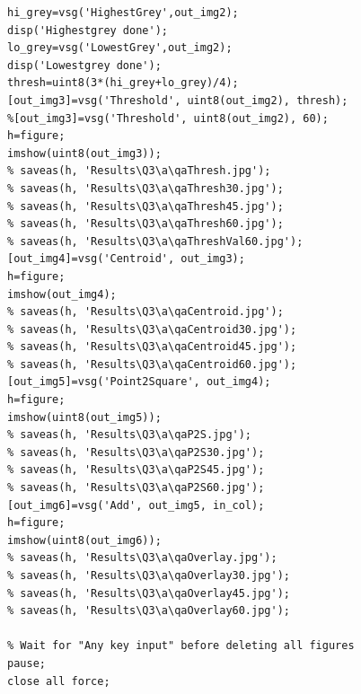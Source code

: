 \documentclass[a4paper]{article}
\begin{document}
\begin{lstlisting}[caption={Part 3 a}]
hi_grey=vsg('HighestGrey',out_img2);
disp('Highestgrey done');
lo_grey=vsg('LowestGrey',out_img2);
disp('Lowestgrey done');
thresh=uint8(3*(hi_grey+lo_grey)/4);
[out_img3]=vsg('Threshold', uint8(out_img2), thresh);
%[out_img3]=vsg('Threshold', uint8(out_img2), 60);
h=figure;
imshow(uint8(out_img3));
% saveas(h, 'Results\Q3\a\qaThresh.jpg');
% saveas(h, 'Results\Q3\a\qaThresh30.jpg');
% saveas(h, 'Results\Q3\a\qaThresh45.jpg');
% saveas(h, 'Results\Q3\a\qaThresh60.jpg');
% saveas(h, 'Results\Q3\a\qaThreshVal60.jpg');
[out_img4]=vsg('Centroid', out_img3);
h=figure;
imshow(out_img4);
% saveas(h, 'Results\Q3\a\qaCentroid.jpg');
% saveas(h, 'Results\Q3\a\qaCentroid30.jpg');
% saveas(h, 'Results\Q3\a\qaCentroid45.jpg');
% saveas(h, 'Results\Q3\a\qaCentroid60.jpg');
[out_img5]=vsg('Point2Square', out_img4);
h=figure;
imshow(uint8(out_img5));
% saveas(h, 'Results\Q3\a\qaP2S.jpg');
% saveas(h, 'Results\Q3\a\qaP2S30.jpg');
% saveas(h, 'Results\Q3\a\qaP2S45.jpg');
% saveas(h, 'Results\Q3\a\qaP2S60.jpg');
[out_img6]=vsg('Add', out_img5, in_col);
h=figure;
imshow(uint8(out_img6));
% saveas(h, 'Results\Q3\a\qaOverlay.jpg');
% saveas(h, 'Results\Q3\a\qaOverlay30.jpg');
% saveas(h, 'Results\Q3\a\qaOverlay45.jpg');
% saveas(h, 'Results\Q3\a\qaOverlay60.jpg');

% Wait for "Any key input" before deleting all figures
pause;
close all force;
\end{lstlisting}
\end{document}
